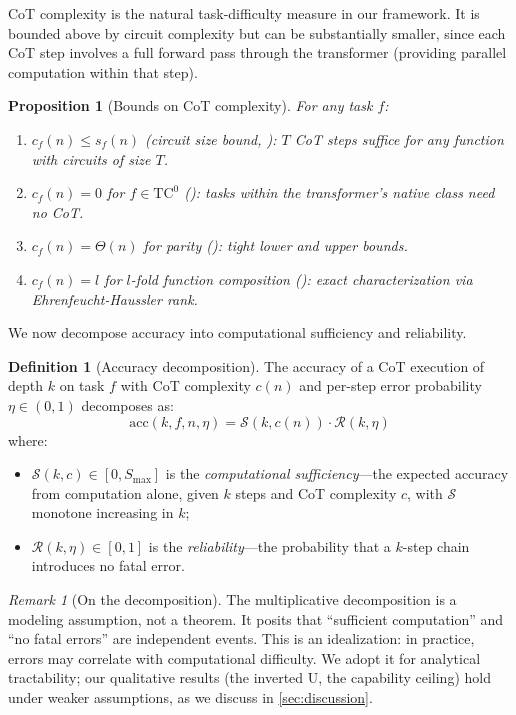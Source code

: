 \documentclass{article}
\newtheorem{proposition}[theorem]{Proposition}
\theoremstyle{definition}
\newtheorem{definition}[theorem]{Definition}
\theoremstyle{remark}
\newtheorem{remark}[theorem]{Remark}
\providecommand{\TC}{\mathrm{TC}^0}
\newcommand{\noise}{\eta}      %
\newcommand{\acc}{\mathrm{acc}} %
\newcommand{\suf}{\mathcal{S}} %
\newcommand{\rel}{\mathcal{R}} %
\newcommand{\ccot}{c}          %
\newcommand{\Smax}{S_{\max}}   %
\begin{document}
CoT complexity is the natural task-difficulty measure in our framework. It is bounded above by circuit complexity but can be substantially smaller, since each CoT step involves a full forward pass through the transformer (providing parallel computation within that step).

\begin{proposition}[Bounds on CoT complexity]
\label{prop:cot-bounds}
For any task $f$:
\begin{enumerate}
\item $\ccot_f(n) \leq s_f(n)$ \emph{(circuit size bound, \citet{li2024chain}):} $T$ CoT steps suffice for any function with circuits of size $T$.
\item $\ccot_f(n) = 0$ for $f \in \TC$ \emph{(\citet{merrill2022saturated}):} tasks within the transformer's native class need no CoT.
\item $\ccot_f(n) = \Theta(n)$ for parity \emph{(\citet{amiri2025lower}):} tight lower and upper bounds.
\item $\ccot_f(n) = l$ for $l$-fold function composition \emph{(\citet{barcelo2025ehrenfeucht}):} exact characterization via Ehrenfeucht-Haussler rank.
\end{enumerate}
\end{proposition}

We now decompose accuracy into computational sufficiency and reliability.

\begin{definition}[Accuracy decomposition]
\label{def:accuracy}
The accuracy of a CoT execution of depth $k$ on task $f$ with CoT complexity $\ccot(n)$ and per-step error probability $\noise \in (0,1)$ decomposes as:
\[
\acc(k, f, n, \noise) = \suf(k, \ccot(n)) \cdot \rel(k, \noise)
\]
where:
\begin{itemize}
\item $\suf(k, c) \in [0, \Smax]$ is the \emph{computational sufficiency}---the expected accuracy from computation alone, given $k$ steps and CoT complexity $c$, with $\suf$ monotone increasing in $k$;
\item $\rel(k, \noise) \in [0, 1]$ is the \emph{reliability}---the probability that a $k$-step chain introduces no fatal error.
\end{itemize}
\end{definition}

\begin{remark}[On the decomposition]
\label{rem:decomposition}
The multiplicative decomposition is a modeling assumption, not a theorem. It posits that ``sufficient computation'' and ``no fatal errors'' are independent events. This is an idealization: in practice, errors may correlate with computational difficulty. We adopt it for analytical tractability; our qualitative results (the inverted U, the capability ceiling) hold under weaker assumptions, as we discuss in \cref{sec:discussion}.
\end{remark}
\end{document}
